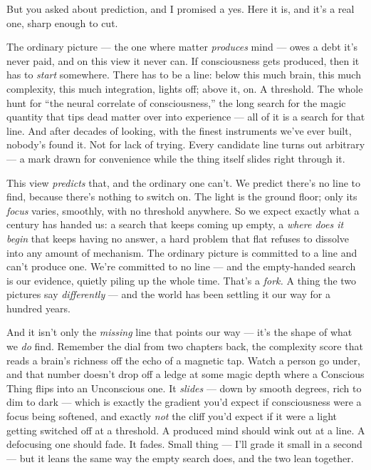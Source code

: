 \documentclass[11pt,openany]{book}
\begin{document}
But you asked about prediction, and I promised a yes. Here it is, and it’s a real one, sharp enough to cut.

The ordinary picture — the one where matter \textit{produces} mind — owes a debt it’s never paid, and on this view it never can. If consciousness gets produced, then it has to \textit{start} somewhere. There has to be a line: below this much brain, this much complexity, this much integration, lights off; above it, on. A threshold. The whole hunt for “the neural correlate of consciousness,” the long search for the magic quantity that tips dead matter over into experience — all of it is a search for that line. And after decades of looking, with the finest instruments we’ve ever built, nobody’s found it. Not for lack of trying. Every candidate line turns out arbitrary — a mark drawn for convenience while the thing itself slides right through it.

This view \textit{predicts} that, and the ordinary one can’t. We predict there’s no line to find, because there’s nothing to switch on. The light is the ground floor; only its \textit{focus} varies, smoothly, with no threshold anywhere. So we expect exactly what a century has handed us: a search that keeps coming up empty, a \textit{where does it begin} that keeps having no answer, a hard problem that flat refuses to dissolve into any amount of mechanism. The ordinary picture is committed to a line and can’t produce one. We’re committed to no line — and the empty-handed search is our evidence, quietly piling up the whole time. That’s a \textit{fork.} A thing the two pictures say \textit{differently} — and the world has been settling it our way for a hundred years.

And it isn’t only the \textit{missing} line that points our way — it’s the shape of what we \textit{do} find. Remember the dial from two chapters back, the complexity score that reads a brain’s richness off the echo of a magnetic tap. Watch a person go under, and that number doesn’t drop off a ledge at some magic depth where a Conscious Thing flips into an Unconscious one. It \textit{slides} — down by smooth degrees, rich to dim to dark — which is exactly the gradient you’d expect if consciousness were a focus being softened, and exactly \textit{not} the cliff you’d expect if it were a light getting switched off at a threshold. A produced mind should wink out at a line. A defocusing one should fade. It fades. Small thing — I’ll grade it small in a second — but it leans the same way the empty search does, and the two lean together.
\end{document}
